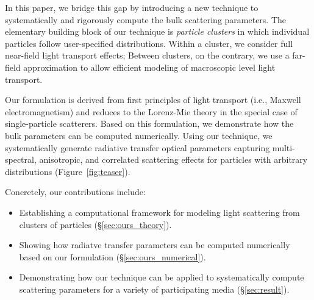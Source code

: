 In this paper, we bridge this gap by introducing a new technique to systematically and rigorously compute the bulk scattering parameters. %
The elementary building block of our technique is \emph{particle clusters} in which individual particles follow user-specified distributions.
Within a cluster, we consider full near-field light transport effects; Between clusters, on the contrary, we use a far-field approximation to allow efficient modeling of macroscopic level light transport.

Our formulation is derived from first principles of light transport (i.e., Maxwell electromagnetism) and reduces to the Lorenz-Mie theory in the special case of single-particle scatterers. Based on this formulation, we demonstrate how the bulk parameters can be computed numerically. Using our technique, we systematically generate radiative transfer optical parameters capturing multi-spectral, anisotropic, and correlated scattering effects for particles with arbitrary distributions (Figure~\ref{fig:teaser}).

Concretely, our contributions include:
%
\begin{itemize}
    \item Establishing a computational framework for modeling light scattering from clusters of particles (\S\ref{sec:ours_theory}).
    \item Showing how radiatve transfer parameters can be computed numerically based on our formulation (\S\ref{sec:ours_numerical}).
    \item Demonstrating how our technique can be applied to systematically compute scattering parameters for a variety of participating media (\S\ref{sec:result}).
\end{itemize}
